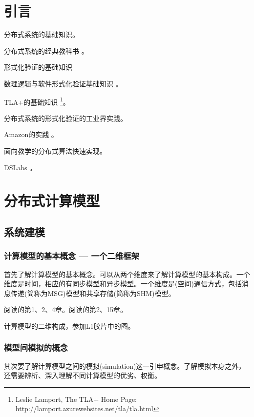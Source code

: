 \chapter{引言}

分布式系统的基础知识。

\myleaf 分布式系统的经典教科书 \cite{Tanenbaum06}。

形式化验证的基础知识

\myleaf 数理逻辑与软件形式化验证基础知识 \cite{Huth04}。

\myleaf TLA+的基础知识 \footnote{Leslie Lamport, The TLA+ Home Page: http://lamport.azurewebsites.net/tla/tla.html}。

分布式系统的形式化验证的工业界实践。

\myleaf Amazon的实践 \cite{Newcombe15}。

面向教学的分布式算法快速实现。

\myleaf DSLabs \cite{Michael19}。

\chapter{分布式计算模型}

\section{系统建模}

\subsection{计算模型的基本概念 --- 一个二维框架}

首先了解计算模型的基本概念。可以从两个维度来了解计算模型的基本构成。一个维度是时间，相应的有同步模型和异步模型。一个维度是(空间)通信方式，包括消息传递(简称为MSG)模型和共享存储(简称为SHM)模型。

\myleaf 阅读\cite{Attiya04}的第1、2、4章。阅读\cite{Aspnes19}的第2、15章。

\myleaf 计算模型的二维构成，参加L1胶片中的图。

\subsection{模型间模拟的概念}

其次要了解计算模型之间的模拟(simulation)这一引申概念。了解模拟本身之外，还需要辨析、深入理解不同计算模型的优劣、权衡。

